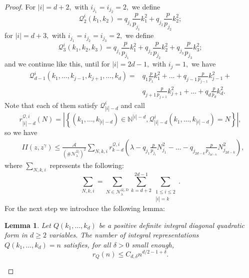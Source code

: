 \documentclass{amsart}
\newtheorem{lemma}[theorem]{Lemma}
\theoremstyle{definition}
\theoremstyle{remark}
\renewcommand\leq\leqslant
\renewcommand\geq\geqslant
\numberwithin{equation}{section}
\theoremstyle{definition}
\theoremstyle{remark}
\begin{document}
\begin{proof}
		 For $|i|=d+2,$ with $i_{j_1}=i_{j_2}=2,$ we define \begin{equation}
		 	\mathcal{Q}^i_2(k_1,k_2)=q_{j_1}\frac{p}{p_{j_1}}k_1^2+q_{j_2}\frac{p}{p_{j_2}}k_2^2;
		 \end{equation} for $|i|=d+3,$ with $i_{j_1}=i_{j_2}=i_{j_3}=2,$ we define \begin{equation}
		 \mathcal{Q}^i_3(k_1,k_2, k_3)=q_{j_1}\frac{p}{p_{j_1}}k_1^2+q_{j_2}\frac{p}{p_{j_2}}k_2^2+q_{j_3}\frac{p}{p_{j_3}}k_3^2;
		 \end{equation}and we continue like this, until for $|i|=2d-1,$ with $i_{j}=1,$ we have \begin{equation}\begin{aligned}
		 	\mathcal{Q}^i_{d-1}(k_1,\ldots,k_{j-1},k_{j+1},\ldots, k_d)=&q_{1}\frac{p}{p_{1}}k_1^2+\ldots+q_{j-1}\frac{p}{p_{j-1}}k_{j-1}^2+\\&q_{j+1}\frac{p}{p_{j+1}}k_{j+1}^2+\ldots+q_{d}\frac{p}{p_{d}}k_d^2.
		 \end{aligned}
	\end{equation}
	Note that each of them satisfy  $\mathcal{Q}^i_{|i|-d}$ and call \begin{equation}
		r^{\mathcal{Q},i}_{|i|-d}(N)=\left|\left\{(k_1,\ldots,k_{|i|-d})\in\mathbb{N}^{|i|-d}, \mathcal{Q}^i_{|i|-d}(k_1,\ldots,k_{|i|-d})=N\right\}\right|,
	\end{equation} so we have\begin{equation}
		\begin{aligned}
			&II(z,z^\gamma)\leq\frac{\mathcal{A}}{\left(\#\mathcal{N}_\lambda^{\mathcal{Q}_l}\right)^2}\sum_{N,k,i}r^{\mathcal{Q},i}_{k-d}\left(\lambda-q_{j_1}\frac{p}{p_{j_1}}N_{j_1}^2-\ldots-q_{j_{2d-k}}\frac{p}{p_{j_{2d-k}}}N_{j_{2d-k}}^2\right),
		\end{aligned}
	\end{equation}where $\sum_{N,k,i}$ represents the following:\begin{equation}\sum_{N,k,i}=\sum_{N\in\mathcal{N}_\lambda^{\mathcal{Q}_l,\mathrm{D}}}\sum_{k=d+2}^{2d-1}\sum_{\substack{1\leq i\leq 2\\|i|=k}}.\end{equation}For the next step we introduce the following lemma:
	
	 \begin{lemma}\label{algebralemma}
		Let $Q\left(k_1, \ldots, k_d\right)$ be a positive definite integral diagonal quadratic form in $d \geq 2$ variables.
		The number of integral representations $Q\left(k_1, \ldots, k_d\right)=n$ satisfies, for all $\delta>0$ small enough,
			\begin{equation}
			r_Q(n)\leq C_{d,\delta} n^{d / 2-1+\delta} .
		\end{equation}
		

\end{lemma}
\end{proof}
\end{document}
